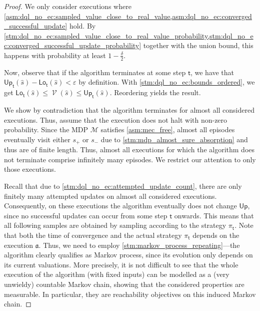 \documentclass{theoretics}
\newcommand{\MDP}{\mathcal{M}}
\newcommand{\initialstate}{\hat{s}}
\newcommand{\strategy}{\pi}
\DeclareMathOperator{\val}{\mathcal{V}}
\newcommand{\upperbound}{\mathsf{Up}}
\newcommand{\lowerbound}{\mathsf{Lo}}
\newcommand{\targetstate}{s_+}
\newcommand{\sinkstate}{s_-}
\newcommand{\algostep}{\mathsf{t}}
\newcommand{\algorithmexecution}{\mathfrak{a}}
\begin{document}
\begin{proof}
	We only consider executions where \cref{asm:dql_no_ec:sampled_value_close_to_real_value,asm:dql_no_ec:converged_successful_update} hold.
	By \cref{stm:dql_no_ec:sampled_value_close_to_real_value_probability,stm:dql_no_ec:converged_successful_update_probability} together with the union bound, this happens with probability at least $1 - \frac{\delta}{2}$.

	Now, observe that if the algorithm terminates at some step $\algostep$, we have that $\upperbound_\algostep(\initialstate) - \lowerbound_\algostep(\initialstate) < \varepsilon$ by definition.
	With \cref{stm:dql_no_ec:bounds_ordered}, we get $\lowerbound_\algostep(\initialstate) \leq \val(\initialstate) \leq \upperbound_\algostep(\initialstate)$.
    Reordering yields the result.

	We show by contradiction that the algorithm terminates for almost all considered executions.
	Thus, assume that the execution does not halt with non-zero probability.
	Since the MDP $\MDP$ satisfies \cref{asm:mec_free}, almost all episodes eventually visit either $\targetstate$ or $\sinkstate$ due to \cref{stm:mdp_almost_sure_absorption} and thus are of finite length.
	Thus, almost all executions for which the algorithm does not terminate comprise infinitely many episodes.
	We restrict our attention to only those executions.

	Recall that due to \cref{stm:dql_no_ec:attempted_update_count}, there are only finitely many attempted updates on almost all considered executions.
	Consequently, on these executions the algorithm eventually does not change $\upperbound$, since no successful updates can occur from some step $\algostep$ onwards.
	This means that all following samples are obtained by sampling according to the strategy $\strategy_\algostep$.
	Note that both the time of convergence and the actual strategy $\strategy_\algostep$ depends on the execution $\algorithmexecution$.
	Thus, we need to employ \cref{stm:markov_process_repeating}---the algorithm clearly qualifies as Markov process, since its evolution only depends on its current valuations.
	More precisely, it is not difficult to see that the whole execution of the algorithm (with fixed inputs) can be modelled as a (very unwieldy) countable Markov chain, showing that the considered properties are measurable.
	In particular, they are reachability objectives on this induced Markov chain.


\end{proof}
\end{document}
